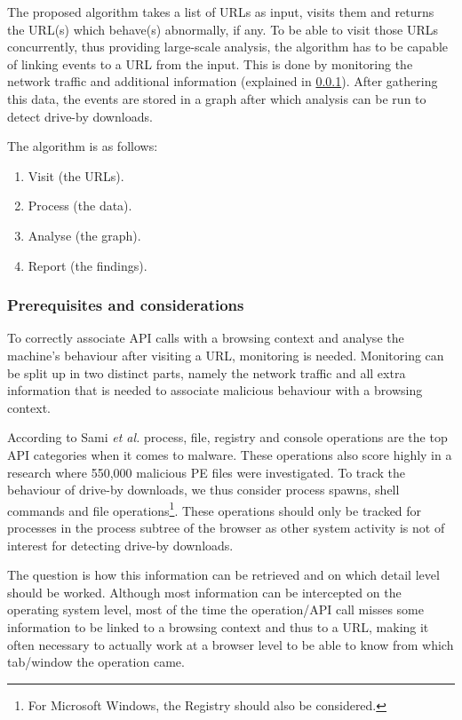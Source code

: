 The proposed algorithm takes a list of URLs as input, visits them and returns the URL(s) which behave(s) abnormally, if any. To be able to visit those URLs concurrently, thus providing large-scale analysis, the algorithm has to be capable of linking events to a URL from the input. This is done by monitoring the network traffic and additional information (explained in \ref{sec:prereq}). After gathering this data, the events are stored in a graph after which analysis can be run to detect drive-by downloads.

The algorithm is as follows:

\begin{changemargin}{5cm}{0cm}
\begin{enumerate}
\item Visit (the URLs).
\item Process (the data).
\item Analyse (the graph).
\item Report (the findings).
\end{enumerate}
\end{changemargin}

\subsubsection{Prerequisites and considerations}
\label{sec:prereq}

To correctly associate API calls with a browsing context and analyse the machine's behaviour after visiting a URL, monitoring is needed. Monitoring can be split up in two distinct parts, namely the network traffic and all extra information that is needed to associate malicious behaviour with a browsing context.

According to Sami \textit{et al.} \cite{Sami:2010:MDB:1774088.1774303} process, file, registry and console operations are the top API categories when it comes to malware. These operations also score highly in a research \cite{MaliciousAPIs} where 550,000 malicious PE files were investigated. To track the behaviour of drive-by downloads, we thus consider process spawns, shell commands and file operations\footnote{For Microsoft Windows, the Registry should also be considered.}. These operations should only be tracked for processes in the process subtree of the browser as other system activity is not of interest for detecting drive-by downloads.

The question is how this information can be retrieved and on which detail level should be worked. Although most information can be intercepted on the operating system level, most of the time the operation/API call misses some information to be linked to a browsing context and thus to a URL, making it often necessary to actually work at a browser level to be able to know from which tab/window the operation came.%

